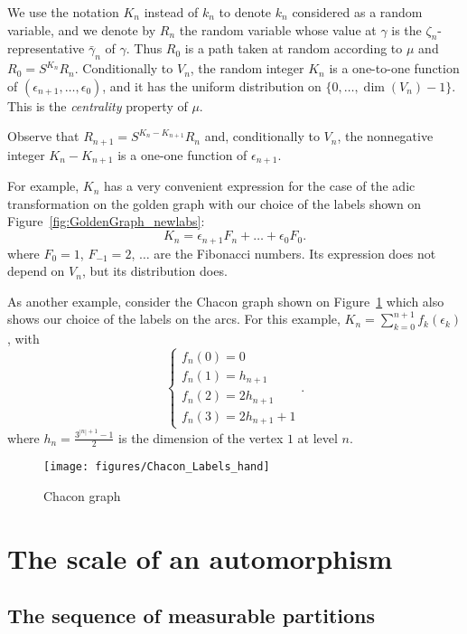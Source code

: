 \documentclass[12pt,a4paper]{article}
\begin{document}
We use the notation $K_n$ instead of $k_n$ to denote $k_n$ considered as 
a random variable, and we denote by $R_n$ the random variable whose 
value at $\gamma$ is the $\zeta_n$-representative 
$\bar\gamma_n$ of $\gamma$. 
Thus $R_0$ is a path taken at random according to $\mu$ and 
$R_0 = S^{K_n} R_n$. 
Conditionally to $V_n$, the random integer $K_n$ is a one-to-one function of 
$(\epsilon_{n+1}, \ldots, \epsilon_0)$, and it has the 
uniform distribution on $\{0, \ldots, \dim(V_n)-1\}$. 
This is the \emph{centrality} property of $\mu$. 

Observe that $R_{n+1} = S^{K_n - K_{n+1}}R_n$ and, 
conditionally to $V_n$, the nonnegative integer $K_n - K_{n+1}$ 
is a one-one function of $\epsilon_{n+1}$. 

For example, $K_n$ has a very convenient expression for the case of the adic 
transformation on the golden graph with our choice of the labels shown on 
Figure~\ref{fig:GoldenGraph_newlabs}:
$$
K_n = \epsilon_{n+1}F_{n} + \ldots + \epsilon_0F_0.   
$$
where $F_0=1$, $F_{-1}=2$,  $\ldots$ are the Fibonacci numbers.  
Its expression does not depend on $V_n$, but its distribution does. 

As another example, consider the Chacon graph shown on Figure~\ref{fig:ChaconGraph} 
which also shows our choice of the labels on the arcs. 
For this example, 
$K_n=\sum_{k=0}^{n+1}f_k(\epsilon_k)$, with  
$$
\begin{cases}
f_n(0) = 0 \\ 
f_n(1) = h_{n+1} \\ 
f_n(2) = 2h_{n+1} \\
f_n(3) = 2 h_{n+1} + 1
\end{cases}.
$$
where $h_n=\frac{3^{|n|+1}-1}{2}$ is the dimension of the vertex $1$ at level $n$. 

\begin{figure}[!h]
   \centering
   	\texttt{[image: figures/Chacon\_Labels\_hand]}
   \caption{Chacon graph}\label{fig:ChaconGraph}
 \end{figure}


\section{The scale of an automorphism}

\subsection{The sequence of measurable partitions}
\end{document}
